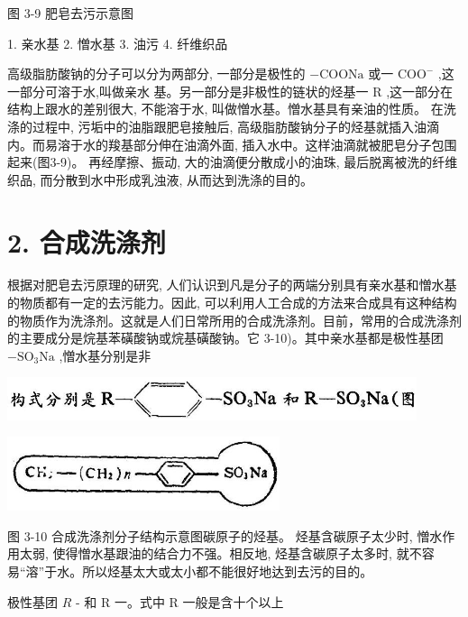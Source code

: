 \documentclass[10pt]{article}
\begin{document}
图 3-9 肥皂去污示意图

1. 亲水基 2. 憎水基 3. 油污 4. 纤维织品

高级脂肪酸钠的分子可以分为两部分, 一部分是极性的 \(- \mathrm{{COONa}}\) 或一 \({\mathrm{{COO}}}^{ - }\) ,这一部分可溶于水,叫做亲水 基。另一部分是非极性的链状的烃基一 \(\mathrm{R}\) ,这一部分在结构上跟水的差别很大, 不能溶于水, 叫做憎水基。憎水基具有亲油的性质。 在洗涤的过程中, 污垢中的油脂跟肥皂接触后, 高级脂肪酸钠分子的烃基就插入油滴内。而易溶于水的羧基部分伸在油滴外面, 插入水中。这样油滴就被肥皂分子包围起来(图3-9)。 再经摩擦、振动, 大的油滴便分散成小的油珠, 最后脱离被洗的纤维织品, 而分散到水中形成乳浊液, 从而达到洗涤的目的。

\section*{2. 合成洗涤剂}

根据对肥皂去污原理的研究, 人们认识到凡是分子的两端分别具有亲水基和憎水基的物质都有一定的去污能力。因此, 可以利用人工合成的方法来合成具有这种结构的物质作为洗涤剂。这就是人们日常所用的合成洗涤剂。目前，常用的合成洗涤剂的主要成分是烷基苯磺酸钠或烷基磺酸钠。它 3-10)。其中亲水基都是极性基团 \(- {\mathrm{{SO}}}_{3}\mathrm{{Na}}\) ,憎水基分别是非

\begin{center}
\includegraphics[max width=0.9\textwidth]{images/01912d16-be99-77bb-9535-4f3ed8d9946f_147_499304.jpg}
\end{center}

\begin{center}
\includegraphics[max width=0.6\textwidth]{images/01912d16-be99-77bb-9535-4f3ed8d9946f_148_447776.jpg}
\end{center}

图 3-10 合成洗涤剂分子结构示意图碳原子的烃基。 烃基含碳原子太少时, 憎水作用太弱, 使得憎水基跟油的结合力不强。相反地, 烃基含碳原子太多时, 就不容易“溶”于水。所以烃基太大或太小都不能很好地达到去污的目的。

极性基团 \(R\) - 和 \(\mathrm{R}\) 一。式中 \(\mathrm{R}\) 一般是含十个以上
\end{document}
